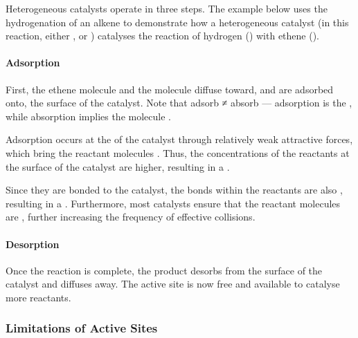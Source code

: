 				Heterogeneous catalysts operate in three steps. The example below uses the hydrogenation of an alkene to demonstrate how a
				heterogeneous catalyst (in this reaction, either ,  or ) catalyses the reaction of
				hydrogen () with ethene ().


				\paragraph{Adsorption}

				First, the ethene molecule and the  molecule diffuse toward, and are adsorbed onto, the surface of the catalyst.
				Note that adsorb ≠ absorb --- adsorption is the , while absorption implies the molecule .

				Adsorption occurs at the  of the catalyst through relatively weak attractive forces, which bring
				the reactant molecules . Thus, the concentrations of the reactants at the surface of the catalyst
				are higher, resulting in a .

				Since they are bonded to the catalyst, the bonds within the reactants are also , resulting in a
				. Furthermore, most catalysts ensure that the reactant molecules are
				, further increasing the frequency of effective collisions.



				\paragraph{Desorption}

				Once the reaction is complete, the product desorbs from the surface of the catalyst and diffuses away. The active site is now
				free and available to catalyse more reactants.




			\subsubsection{Limitations of Active Sites}


